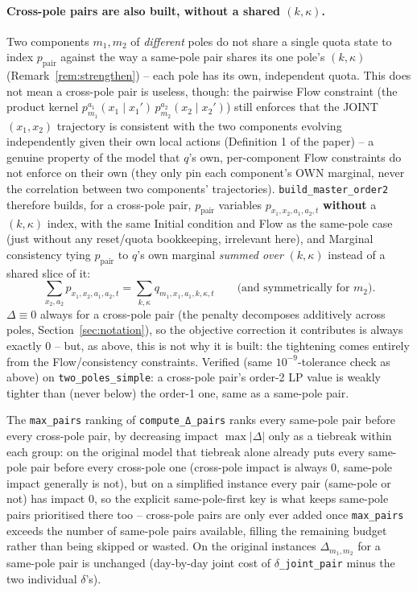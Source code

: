 \documentclass[11pt]{article}
\begin{document}
\paragraph{Cross-pole pairs are also built, without a shared $(k,\kappa)$.} Two components
$m_1,m_2$ of \emph{different} poles do not share a single quota state to index
$p_{\mathrm{pair}}$ against the way a same-pole pair shares its one pole's $(k,\kappa)$
(Remark~\ref{rem:strengthen}) -- each pole has its own, independent quota. This does not
mean a cross-pole pair is useless, though: the pairwise Flow constraint (the product kernel
$p_{m_1}^{a_1}(x_1\mid x_1') \, p_{m_2}^{a_2}(x_2\mid x_2')$) still enforces that the JOINT
$(x_1,x_2)$ trajectory is consistent with the two components evolving independently given
their own local actions (Definition 1 of the paper) -- a genuine property of the model that
$q$'s own, per-component Flow constraints do not enforce on their own (they only pin each
component's OWN marginal, never the correlation between two components' trajectories).
\texttt{build\_master\_order2} therefore builds, for a cross-pole pair, $p_{\mathrm{pair}}$
variables $p_{x_1,x_2,a_1,a_2,t}$ \textbf{without} a $(k,\kappa)$ index, with the same
Initial condition and Flow as the same-pole case (just without any reset/quota bookkeeping,
irrelevant here), and Marginal consistency tying $p_{\mathrm{pair}}$ to $q$'s own marginal
\emph{summed over} $(k,\kappa)$ instead of a shared slice of it:
\[
  \sum_{x_2,a_2} p_{x_1,x_2,a_1,a_2,t} = \sum_{k,\kappa} q_{m_1,x_1,a_1,k,\kappa,t}
  \qquad\text{(and symmetrically for $m_2$).}
\]
$\Delta \equiv 0$ always for a cross-pole pair (the penalty decomposes additively across
poles, Section~\ref{sec:notation}), so the objective correction it contributes is always
exactly $0$ -- but, as above, this is not why it is built: the tightening comes entirely
from the Flow/consistency constraints. Verified (same $10^{-9}$-tolerance check as above)
on \texttt{two\_poles\_simple}: a cross-pole pair's order-2 LP value is weakly tighter than
(never below) the order-1 one, same as a same-pole pair.

The \texttt{max\_pairs} ranking of \texttt{compute\_Δ\_pairs} ranks every same-pole pair
before every cross-pole pair, by decreasing impact $\max|\Delta|$ only as a tiebreak within
each group: on the original model that tiebreak alone already puts every same-pole pair
before every cross-pole one (cross-pole impact is always $0$, same-pole impact generally is
not), but on a simplified instance every pair (same-pole or not) has impact $0$, so the
explicit same-pole-first key is what keeps same-pole pairs prioritised there too -- cross-pole
pairs are only ever added once \texttt{max\_pairs} exceeds the number of same-pole pairs
available, filling the remaining budget rather than being skipped or wasted.
On the original instances $\Delta_{m_1,m_2}$ for a same-pole pair is unchanged (day-by-day
joint cost of \texttt{$\delta$\_joint\_pair} minus the two individual $\delta$'s).
\end{document}
